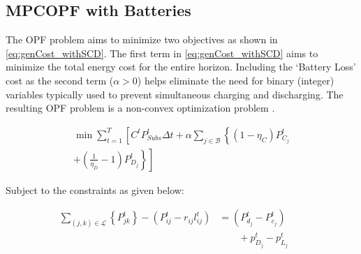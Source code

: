 \documentclass[../../outputs/main.tex]{subfiles}
\begin{document}
\subsection{MPCOPF with Batteries}
The OPF problem aims to minimize two objectives as shown in \cref{eq:genCost_withSCD}. The first term in \cref{eq:genCost_withSCD} aims to minimize the total energy cost for the entire horizon. Including the `Battery Loss' cost as the second term ($\alpha > 0$) helps eliminate the need for binary (integer) variables typically used to prevent simultaneous charging and discharging. The resulting OPF problem is a non-convex optimization problem \cite{Nazir2021Sep}.

\begin{equation}
    \begin{split}
        \min \sum_{t = 1}^{T} \left[ C^t P^t_{Subs} \Delta t+ \alpha \sum_{j \in \mathcal{B}} \left\{ (1-\eta_C)P^t_{C_j} \right. \right. \\
        \left. \left. + \left( \frac{1}{\eta_D} - 1 \right) P^t_{D_j} \right\} \right]
    \end{split}
    \label{eq:genCost_withSCD}
\end{equation}


Subject to the constraints  as given below:

\begin{align}
    {\sum_{(j, k) \in \mathcal{L}} \left\{P_{jk}^t\right\} 
    - \left(P_{ij}^t - r_{ij}l_{ij}^t\right)} &= {\left(P_{d_j}^t - P_{c_j}^t\right)} \nonumber \\[-0.8em]
    {} & {\qquad  + p^t_{D_j} - p^t_{L_j}}
    \label{eq:RealPowerBalanceNodej} &&
\end{align}
\end{document}
